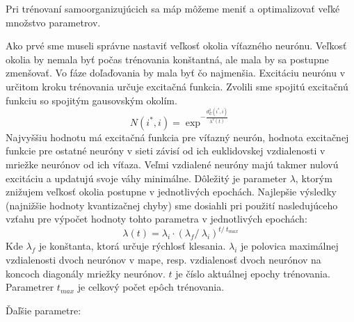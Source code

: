 Pri trénovaní samoorganizujúcich sa máp môžeme meniť a optimalizovať veľké množstvo parametrov. 

Ako prvé sme museli správne nastaviť veľkosť okolia víťazného neurónu.
Veľkosť okolia by nemala byť počas trénovania konštantná, ale mala by sa postupne zmenšovať.
Vo fáze doľaďovania by mala byť čo najmenšia.
Excitáciu neurónu v určitom kroku trénovania určuje excitačná funkcia. Zvolili sme spojitú
excitačnú funkciu so spojitým gausovským okolím. 
\begin{equation}
    N(i^{*}, i) = \exp^{- \frac{d^{2}_{E}(i^{*}, i)}{\lambda^{2}(t)}}
\end{equation}
Najvyššiu hodnotu má excitačná funkcia pre víťazný neurón, hodnota excitačnej funkcie pre ostatné 
neuróny v sieti závisí od ich euklidovskej vzdialenosti v mriežke neurónov od ich víťaza. Veľmi vzdialené neuróny 
majú takmer nulovú excitáciu a updatujú svoje váhy minimálne.
Dôležitý je parameter $\lambda$, ktorým znižujem veľkosť okolia postupne v jednotlivých epochách.
Najlepšie výsledky (najnižšie hodnoty kvantizačnej chyby) sme dosiahli pri použití nasledujúceho vzťahu pre výpočet hodnoty tohto parametra
v jednotlivých epochách:
\begin{equation}
    \lambda{(t)} = \lambda_{i} \cdot (\lambda_{f} /\ \lambda_{i})^{t /\ t_{max}}
\end{equation}
Kde $\lambda_{f}$ je konštanta, ktorá určuje rýchlosť klesania. 
$\lambda_{i}$ je polovica maximálnej vzdialenosti dvoch neurónov v mape, resp. 
vzdialenosť dvoch neurónov na koncoch diagonály mriežky neurónov.
$t$ je číslo aktuálnej epochy trénovania. Parametrer $t_{max}$ je celkový počet 
epôch trénovania.

Ďaľšie parametre:

